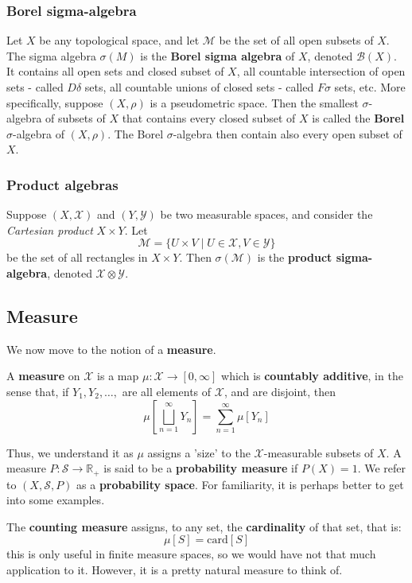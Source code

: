 \subsubsection{Borel sigma-algebra}
Let $X$ be any topological space, and let $\mathcal{M}$ be the set of all open subsets of $X$. The sigma algebra $\sigma(M)$ is the \textbf{Borel sigma algebra} of $X$, denoted $\mathcal{B}(X)$. It contains all open sets and closed subset of $X$, all countable intersection of open sets - called $D\delta$ sets, all countable unions of closed sets - called $F\sigma$ sets, etc. More specifically, suppose $(X,\rho)$ is a pseudometric space. Then the smallest $\sigma$-algebra of subsets of $X$ that contains every closed subset of $X$ is called the \textbf{Borel} $\sigma$-algebra of $(X,\rho)$. The Borel $\sigma$-algebra then contain also every open subset of $X$. 

\subsubsection{Product algebras}
Suppose $(X,\mathcal{X})$ and $(Y,\mathcal{Y})$ be two measurable spaces, and consider the \textit{Cartesian product} $X\times Y$. Let $$\mathcal{M}=\{ U\times V\mid U\in \mathcal{X},V\in \mathcal{Y} \}$$
be the set of all rectangles in $X\times Y$. Then $\sigma(\mathcal{M})$ is the \textbf{product sigma-algebra}, denoted $\mathcal{X}\otimes \mathcal{Y}$. 

\subsection{Measure}
We now move to the notion of a \textbf{measure}. 
\begin{definition}[Measure]
    A \textbf{measure} on $\mathcal{X}$ is a map $\mu: \mathcal{X}\to [0,\infty]$ which is \textbf{countably additive}, in the sense that, if $Y_{1},Y_{2},\dots,$ are all elements of $\mathcal{X}$, and are disjoint, then $$\mu\left[ \bigsqcup^{\infty}_{n=1} Y_{n} \right]=\sum^{\infty}_{n=1}\mu[Y_{n}]$$
\end{definition}

Thus, we understand it as $\mu$ assigns a 'size' to the $\mathcal{X}$-measurable subsets of $X$. A measure $P:\mathcal{S}\to \mathbb{R}_{+}$ is said to be a \textbf{probability measure} if $P(X)=1$. We refer to $(X,\mathcal{S},P)$ as a \textbf{probability space}. For familiarity, it is perhaps better to get into some examples. 
\begin{example}
    The \textbf{counting measure} assigns, to any set, the \textbf{cardinality} of that set, that is: $$\mu[S]=\mathrm{card}[S]$$
this is only useful in finite measure spaces, so we would have not that much application to it. However, it is a pretty natural measure to think of. 
\end{example}

